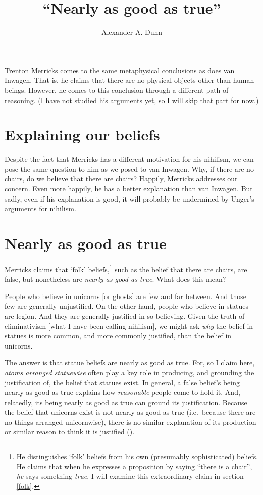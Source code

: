 \documentclass[11pt]{article}
\title{``Nearly as good as true''}
\author{Alexander A. Dunn}
\newenvironment{squote}{%
\begin{spacing}{1}
       	\begin{list}{}{%
\setlength{\labelwidth}{0pt}%
\rightmargin\leftmargin%
}
\item\relax
}{%
\end{list}%
\end{spacing}
}
\begin{document}
\ifstandalone
\maketitle
\begin{spacing}{1.25}
\fi

\label{merricks}
Trenton Merricks comes to the same metaphysical conclusions as does
van Inwagen.  That is, he claims that there are no physical objects
other than human beings.  However, he comes to this conclusion through
a different path of reasoning.  (I have not studied his arguments yet,
so I will skip that part for now.)

\section{Explaining our beliefs}
\label{m-exp}
Despite the fact that Merricks has a different motivation for his
nihilism, we can pose the same question to him as we posed to van
Inwagen.  Why, if there are no chairs, do we believe that there are
chairs?  Happily, Merricks addresses our concern.  Even more happily,
he has a better explanation than van Inwagen.  But sadly, even if his
explanation is good, it will probably be undermined by Unger's
arguments for nihilism.

\section{Nearly as good as true}
\label{near}
Merricks claims that `folk' beliefs,\footnote{He distinguishes `folk'
  beliefs from his own (presumably sophisticated) beliefs.  He claims
  that when he expresses a proposition by saying ``there is a chair'',
  {\em he} says something {\em true}.  I will examine this
  extraordinary claim in section \ref{folk}.} such as the belief that
there are chairs, are false, but nonetheless are {\em nearly as good
  as true}.  What does this mean?

\begin{squote}
People who believe in unicorns [or ghosts] are few and far between.
And those few are generally unjustified.  On the other hand, people
who believe in statues are legion.  And they are generally justified
in so believing.  Given the truth of eliminativism [what I have been
  calling nihilism], we might ask {\em why} the belief in statues is
more common, and more commonly justified, than the belief in unicorns.

The answer is that statue beliefs are nearly as good as true.  For, so
I claim here, {\em atoms arranged statuewise} often play a key role in
producing, and grounding the justification of, the belief that statues
exist.  In general, a false belief's being nearly as good as true
explains how {\em reasonable} people come to hold it.  And, relatedly,
its being nearly as good as true can ground its justification.
Because the belief that unicorns exist is not nearly as good as true
(i.e.\ because there are no things arranged unicornwise), there is no
similar explanation of its production or similar reason to think it is
justified (\citeyear[171--172]{merricks2001a}).
\end{squote}


\end{spacing}
\end{document}
